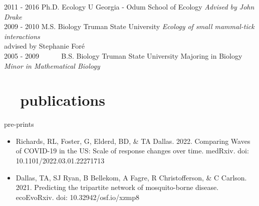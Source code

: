 \documentclass[]{CV}
\begin{document}
\begin{entrylist}
  \entry
    {2011 - 2016}
    {\normalfont Ph.D. Ecology}
    {U Georgia - Odum School of Ecology}
    {\emph{Advised by John Drake}}\\

  \entry
    {2009 - 2010}
    {M.S. Biology}
    {Truman State University}
    {\emph{Ecology of small mammal-tick interactions} \\ advised by Stephanie For\'e}\\

 \entry
    {2005 - 2009 \ \ \ \ \ }
    {B.S. Biology}
    {Truman State University}
    {Majoring in Biology\\
    \emph{Minor in Mathematical Biology}}\\
\end{entrylist}














\section{\faBook \ \  publications}


{\yearfont pre-prints} 

\begin{itemize}

\item Richards, RL, Foster, G, Elderd, BD, \& {\mefont TA Dallas}. 2022. Comparing Waves of COVID-19 in the US: Scale of response changes over time. medRxiv. doi: 10.1101/2022.03.01.22271713 

\item {\mefont Dallas, TA}, SJ Ryan, B Bellekom, A Fagre,  R Christofferson, \& C Carlson. 2021. Predicting the tripartite network of mosquito-borne disease. ecoEvoRxiv. doi: 10.32942/osf.io/xzmp8

\end{itemize}




{}
\end{document}
